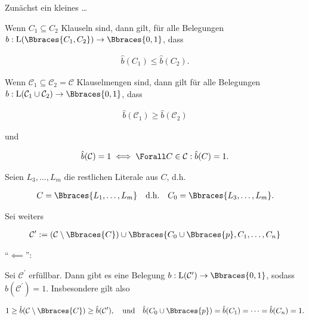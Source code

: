 \begin{solution}

Zunächst ein kleines \dots

\begin{lemma*}

    Wenn $C_1 \subseteq C_2$ Klauseln sind, dann gilt, für alle Belegungen $b: \operatorname L(\Bbraces{C_1, C_2}) \to \Bbraces{0, 1}$, dass

    \begin{align*}
        \hat b(C_1) \leq \hat b(C_2).
    \end{align*}

    Wenn $\mathcal C_1 \subseteq \mathcal C_2 = \mathcal C$ Klauselmengen sind, dann gilt für alle Belegungen $b: \operatorname L(\mathcal C_1 \cup \mathcal C_2) \to \Bbraces{0, 1}$, dass

    \begin{align*}
        \hat b(\mathcal C_1) \geq \hat b(\mathcal C_2)
    \end{align*}

    und
    
    \begin{align*}
        \hat b(\mathcal C) = 1
        \iff
        \Forall C \in \mathcal C: \hat b(C) = 1.
    \end{align*}

\end{lemma*}

Seien $L_3, \dots, L_m$ die restlichen Literale aus $C$, d.h.

\begin{align*}
    C = \Bbraces{L_1, \dots, L_m}
    \quad
    \text{d.h.}
    \quad
    C_0 = \Bbraces{L_3, \dots, L_m}.
\end{align*}

Sei weiters

\begin{align*}
    \mathcal C^\prime
    :=
    (\mathcal C \setminus \Bbraces{C})
    \cup
    \Bbraces{C_0 \cup \Bbraces{p}, C_1, \dots, C_n}
\end{align*}

\enquote{$\impliedby$}:

Sei $\mathcal C^\prime$ erfüllbar.
Dann gibt es eine Belegung $b: \operatorname L(\mathcal C^\prime) \to \Bbraces{0, 1}$, sodass $\hat b(\mathcal C^\prime) = 1$.
Insbesondere gilt also

\begin{align*}
    1 \geq \hat b(\mathcal C \setminus \Bbraces{C}) \geq \hat b(\mathcal C^\prime),
    \quad
    \text{und}
    \quad
    \hat b(C_0 \cup \Bbraces{p}) = \hat b(C_1) = \dots = \hat b(C_n) = 1.
\end{align*}


\end{solution}
